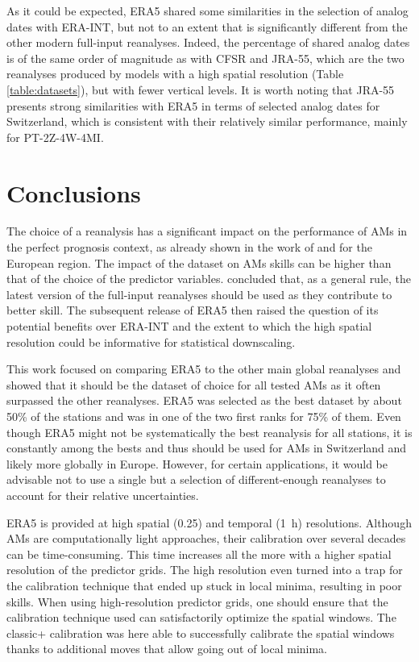 \documentclass[alpha-refs]{wiley-article}
\begin{document}
As it could be expected, ERA5 shared some similarities in the selection of analog dates with ERA-INT, but not to an extent that is significantly different from the other modern full-input reanalyses. Indeed, the percentage of shared analog dates is of the same order of magnitude as with CFSR and JRA-55, which are the two reanalyses produced by models with a high spatial resolution (Table \ref{table:datasets}), but with fewer vertical levels. It is worth noting that JRA-55 presents strong similarities with ERA5 in terms of selected analog dates for Switzerland, which is consistent with their relatively similar performance, mainly for PT-2Z-4W-4MI.


\section{Conclusions}
\label{sec:conclusion}

The choice of a reanalysis has a significant impact on the performance of AMs in the perfect prognosis context, as already shown in the work of \citet{Dayon2015} and \citet{Horton2018b} for the European region. The impact of the dataset on AMs skills can be higher than that of the choice of the predictor variables. \citet{Horton2018b} concluded that, as a general rule, the latest version of the full-input reanalyses should be used as they contribute to better skill. The subsequent release of ERA5 then raised the question of its potential benefits over ERA-INT and the extent to which the high spatial resolution could be informative for statistical downscaling.

This work focused on comparing ERA5 to the other main global reanalyses and showed that it should be the dataset of choice for all tested AMs as it often surpassed the other reanalyses. ERA5 was selected as the best dataset by about 50\% of the stations and was in one of the two first ranks for 75\% of them. Even though ERA5 might not be systematically the best reanalysis for all stations, it is constantly among the bests and thus should be used for AMs in Switzerland and likely more globally in Europe. However, for certain applications, it would be advisable not to use a single but a selection of different-enough reanalyses to account for their relative uncertainties.

ERA5 is provided at high spatial (0.25\degree) and temporal (1~h) resolutions. Although AMs are computationally light approaches, their calibration over several decades can be time-consuming. This time increases all the more with a higher spatial resolution of the predictor grids. The high resolution even turned into a trap for the calibration technique that ended up stuck in local minima, resulting in poor skills. When using high-resolution predictor grids, one should ensure that the calibration technique used can satisfactorily optimize the spatial windows. The classic+ calibration \citep{Horton2019} was here able to successfully calibrate the spatial windows thanks to additional moves that allow going out of local minima.
\end{document}
